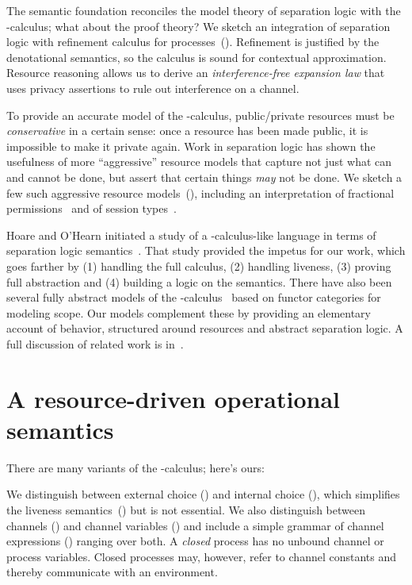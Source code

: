 \documentclass{entcs}
\begin{document}
The semantic foundation reconciles the model theory of separation
logic with the -calculus; what about the proof theory?  We sketch
an integration of separation logic with refinement calculus for
processes~().  Refinement is justified by the
denotational semantics, so the calculus is sound for contextual
approximation.  Resource reasoning allows us to derive an
\emph{interference-free expansion law} that uses privacy assertions to
rule out interference on a channel.



To provide an accurate model of the -calculus, public/private
resources must be \emph{conservative} in a certain sense: once a
resource has been made public, it is impossible to make it private
again.  Work in separation logic has shown the usefulness of more
``aggressive'' resource models that capture not just what can and
cannot be done, but assert that certain things \emph{may} not be done.
We sketch a few such aggressive resource models~(),
including an interpretation of fractional
permissions~\cite{Boyland2003} and of session types~\cite{Honda1998}.

Hoare and O'Hearn initiated a study of a -calculus-like language
in terms of separation logic semantics~\cite{Hoare2008}.  That study
provided the impetus for our work, which goes farther by (1) handling
the full calculus, (2) handling liveness, (3) proving full abstraction
and (4) building a logic on the semantics.  There have also been
several fully abstract models of the
-calculus~\cite{Stark2002,Hennessy2002,Fiore2002} based on
functor categories for modeling scope.  Our models
complement these by providing an elementary account of behavior,
structured around resources and abstract separation logic.  A full
discussion of related work is in~.



\section{A resource-driven operational semantics}
\label{sec:operational}

There are many variants of the -calculus; here's ours:

We distinguish between external choice () and internal choice
(), which simplifies the liveness
semantics~() but is not essential.  We also
distinguish between channels () and channel variables () and
include a simple grammar of channel expressions () ranging over
both.  A \emph{closed} process has no unbound channel or process
variables.  Closed processes may, however, refer to channel constants
and thereby communicate with an environment.
\end{document}
